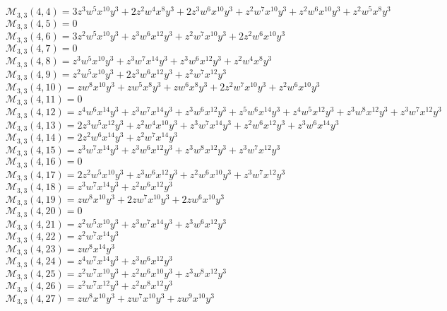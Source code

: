 \documentclass[12pt]{memoireuqam1.3}
\begin{document}
$\mathcal{M}_{3,3}(4,4)=3z^3w^5x^{10}y^3+2z^2w^4x^8y^3+2z^3w^6x^{10}y^3+z^2w^7x^{10}y^3+z^2w^6x^{10}y^3+z^2w^5x^8y^3$\\
$\mathcal{M}_{3,3}(4,5)=0$\\
$\mathcal{M}_{3,3}(4,6)=3z^2w^5x^{10}y^3+z^3w^6x^{12}y^3+z^2w^7x^{10}y^3+2z^2w^6x^{10}y^3$\\
$\mathcal{M}_{3,3}(4,7)=0$\\
$\mathcal{M}_{3,3}(4,8)=z^3w^5x^{10}y^3+z^3w^7x^{14}y^3+z^3w^6x^{12}y^3+z^2w^4x^8y^3$\\
$\mathcal{M}_{3,3}(4,9)=z^2w^5x^{10}y^3+2z^3w^6x^{12}y^3+z^2w^7x^{12}y^3$\\
$\mathcal{M}_{3,3}(4,10)=zw^8x^{10}y^3+zw^5x^8y^3+zw^6x^8y^3+2z^2w^7x^{10}y^3+z^2w^6x^{10}y^3$\\
$\mathcal{M}_{3,3}(4,11)=0$\\
$\mathcal{M}_{3,3}(4,12)=z^4w^6x^{14}y^3+z^3w^7x^{14}y^3+z^3w^6x^{12}y^3+z^5w^6x^{14}y^3+z^4w^5x^{12}y^3+z^3w^8x^{12}y^3+z^3w^7x^{12}y^3$\\
$\mathcal{M}_{3,3}(4,13)=2z^3w^5x^{12}y^3+z^2w^4x^{10}y^3+z^3w^7x^{14}y^3+z^2w^6x^{12}y^3+z^3w^6x^{14}y^3$\\
$\mathcal{M}_{3,3}(4,14)=2z^2w^6x^{14}y^3+z^2w^7x^{14}y^3$\\
$\mathcal{M}_{3,3}(4,15)=z^3w^7x^{14}y^3+z^3w^6x^{12}y^3+z^3w^8x^{12}y^3+z^3w^7x^{12}y^3$\\
$\mathcal{M}_{3,3}(4,16)=0$\\
$\mathcal{M}_{3,3}(4,17)=2z^2w^5x^{10}y^3+z^3w^6x^{12}y^3+z^2w^6x^{10}y^3+z^3w^7x^{12}y^3$\\
$\mathcal{M}_{3,3}(4,18)=z^3w^7x^{14}y^3+z^2w^6x^{12}y^3$\\
$\mathcal{M}_{3,3}(4,19)=zw^8x^{10}y^3+2zw^7x^{10}y^3+2zw^6x^{10}y^3$\\
$\mathcal{M}_{3,3}(4,20)=0$\\
$\mathcal{M}_{3,3}(4,21)=z^2w^5x^{10}y^3+z^3w^7x^{14}y^3+z^3w^6x^{12}y^3$\\
$\mathcal{M}_{3,3}(4,22)=z^2w^7x^{14}y^3$\\
$\mathcal{M}_{3,3}(4,23)=zw^8x^{14}y^3$\\
$\mathcal{M}_{3,3}(4,24)=z^4w^7x^{14}y^3+z^3w^6x^{12}y^3$\\
$\mathcal{M}_{3,3}(4,25)=z^2w^7x^{10}y^3+z^2w^6x^{10}y^3+z^3w^8x^{12}y^3$\\
$\mathcal{M}_{3,3}(4,26)=z^2w^7x^{12}y^3+z^2w^8x^{12}y^3$\\
$\mathcal{M}_{3,3}(4,27)=zw^8x^{10}y^3+zw^7x^{10}y^3+zw^9x^{10}y^3$\\
\end{document}
